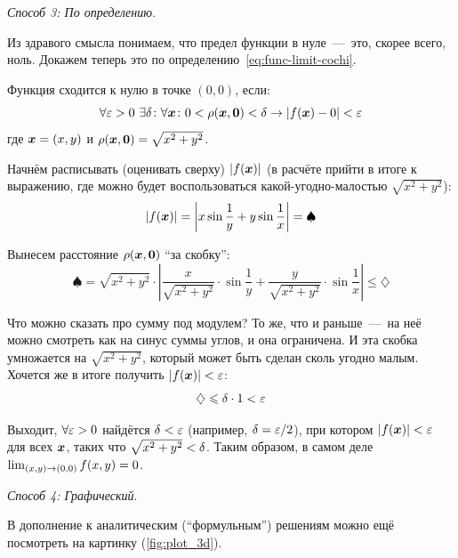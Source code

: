 \documentclass[a4paper,12pt]{article}
\begin{document}
\begin{solution}
    \medskip

    \emph{Способ 3: По определению}.

    Из здравого смысла понимаем, что предел функции в нуле~---~это, скорее всего, ноль.
    Докажем теперь это по определению~\eqref{eq:func-limit-cochi}.

    Функция сходится к нулю в точке $(0, 0)$, если:
    \[
      \forall \varepsilon > 0\ \exists \delta\colon \forall \boldsymbol x \colon 0 < \rho(\boldsymbol x, \boldsymbol 0) < \delta \to |f(\boldsymbol x) - 0| < \varepsilon
    \]
    где $\bds x \hm= (x, y)$ и $\rho(\bds x, \bds 0) \hm= \sqrt{x^2 + y^2}$.

    Начнём расписывать (оценивать сверху) $|f(\boldsymbol x)|$ (в расчёте прийти в итоге к выражению, где можно будет воспользоваться какой-угодно-малостью $\sqrt{x^2 + y^2}$):
    \[
      |f(\boldsymbol x)| = \left|x \sin \frac{1}{y} + y \sin \frac{1}{x}\right| = \spadesuit
    \]

    Вынесем расстояние $\rho(\boldsymbol x, \boldsymbol 0)$ ``за скобку'':
    \[
      \spadesuit = \sqrt{x^2 + y^2} \cdot \left|\frac{x}{\sqrt{x^2 + y^2}} \cdot \sin \frac{1}{y} + \frac{y}{\sqrt{x^2 + y^2}} \cdot \sin \frac{1}{x}\right| \leq \diamondsuit
    \]

    Что можно сказать про сумму под модулем?
    То же, что и раньше~---~на неё можно смотреть как на синус суммы углов, и она ограничена.
    И эта скобка умножается на $\sqrt{x^2 + y^2}$, который может быть сделан сколь угодно малым.
    Хочется же в итоге получить $|f(\bds x)| \hm< \eps$: 
    \[
      \diamondsuit \leqslant \delta \cdot 1 < \varepsilon
    \]

    Выходит, $\forall \eps \hm> 0$ найдётся $\delta \hm< \eps$ (например, $\delta \hm= \eps \hm/ 2$), при котором $|f(\bds x)| \hm< \eps$ для всех $\boldsymbol x$, таких что $\sqrt{x^2 + y^2} \hm< \delta$.
    Таким образом, в самом деле $\lim_{(x, y) \to (0, 0)} f(x, y) \hm= 0$.

    \medskip

    \emph{Способ 4: Графический}.
    
    В дополнение к аналитическим (``формульным'') решениям можно ещё посмотреть на картинку (\ref{fig:plot_3d}).


\end{solution}
\end{document}
